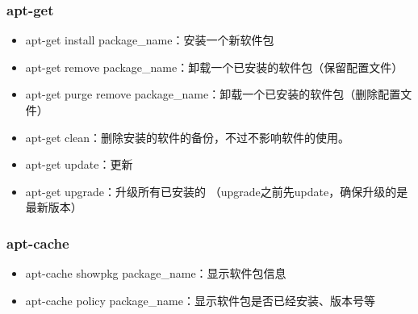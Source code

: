 \documentclass[letterpaper,10pt,english]{sphinxmanual}
\begin{document}
\subsubsection{apt-get}
\label{\detokenize{linux/02_more:apt-get}}\begin{itemize}
\item {} 
apt-get install package\_name：安装一个新软件包

\item {} 
apt-get remove package\_name：卸载一个已安装的软件包（保留配置文件）

\item {} 
apt-get \textendash{}purge remove package\_name：卸载一个已安装的软件包（删除配置文件）

\item {} 
apt-get clean：删除安装的软件的备份，不过不影响软件的使用。

\item {} 
apt-get update：更新 

\item {} 
apt-get upgrade：升级所有已安装的  （upgrade之前先update，确保升级的是最新版本）

\end{itemize}


\subsubsection{apt-cache}
\label{\detokenize{linux/02_more:apt-cache}}\begin{itemize}
\item {} 
apt-cache showpkg package\_name：显示软件包信息

\item {} 
apt-cache policy package\_name：显示软件包是否已经安装、版本号等

\end{itemize}
\end{document}
